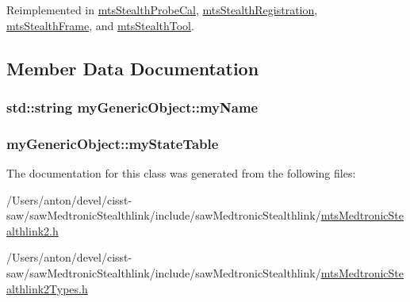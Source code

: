 Reimplemented in \hyperlink{classmts_stealth_probe_cal_ac9426e0e33a2439962ce6499976441df}{mts\+Stealth\+Probe\+Cal}, \hyperlink{classmts_stealth_registration_ad01cf3526c41f762655e3898a0751661}{mts\+Stealth\+Registration}, \hyperlink{classmts_stealth_frame_abcc4616c433c7c6fa4c3fa419c909e28}{mts\+Stealth\+Frame}, and \hyperlink{classmts_stealth_tool_a0e77e6a830e75276f11435b65f8fb376}{mts\+Stealth\+Tool}.



\subsection{Member Data Documentation}
\hypertarget{classmy_generic_object_a092bc6bd9475d195b79eaf1c2976c26d}{}
\subsubsection[{my\+Name}]{\setlength{\rightskip}{0pt plus 5cm}std\+::string my\+Generic\+Object\+::my\+Name\hspace{0.3cm}{\ttfamily [protected]}}\label{classmy_generic_object_a092bc6bd9475d195b79eaf1c2976c26d}
\hypertarget{classmy_generic_object_a5c06baaecad1a458908d7955576c15b2}{}
\subsubsection[{my\+State\+Table}]{ my\+Generic\+Object\+::my\+State\+Table\hspace{0.3cm}{\ttfamily [protected]}}\label{classmy_generic_object_a5c06baaecad1a458908d7955576c15b2}


The documentation for this class was generated from the following files\+:\begin{DoxyCompactItemize}
\item 
/\+Users/anton/devel/cisst-\/saw/saw\+Medtronic\+Stealthlink/include/saw\+Medtronic\+Stealthlink/\hyperlink{mts_medtronic_stealthlink2_8h}{mts\+Medtronic\+Stealthlink2.\+h}\item 
/\+Users/anton/devel/cisst-\/saw/saw\+Medtronic\+Stealthlink/include/saw\+Medtronic\+Stealthlink/\hyperlink{mts_medtronic_stealthlink2_types_8h}{mts\+Medtronic\+Stealthlink2\+Types.\+h}\end{DoxyCompactItemize}
